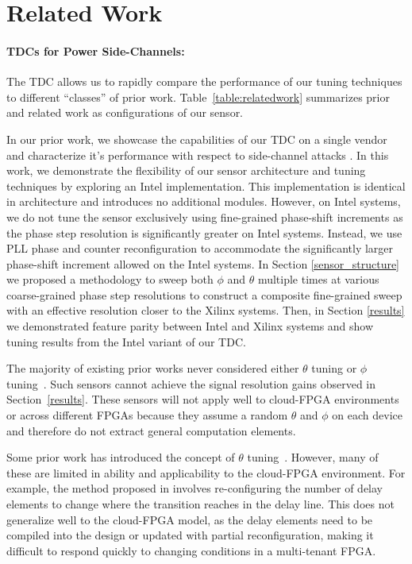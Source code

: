 
\section{Related Work}
\label{related}
\paragraph{\textbf{TDCs for Power Side-Channels: }}

The \name TDC allows us to rapidly compare the performance of our tuning techniques to different ``classes'' of prior work. Table~\ref{table:relatedwork} summarizes prior and related work as configurations of our sensor. 

In our prior work, we showcase the capabilities of our \name TDC on a single vendor and characterize it's performance with respect to side-channel attacks \cite{prior}. In this work, we demonstrate the flexibility of our sensor architecture and tuning techniques by exploring an Intel implementation. This implementation is identical in architecture and introduces no additional modules. However, on Intel systems, we do not tune the sensor exclusively using fine-grained phase-shift increments as the phase step resolution is significantly greater on Intel systems. Instead, we use PLL phase and counter reconfiguration to accommodate the significantly larger phase-shift increment allowed on the Intel systems. In Section \ref{sensor_structure} we proposed a methodology to sweep both $\phi$ and $\theta$ multiple times at various coarse-grained phase step resolutions to construct a composite fine-grained sweep with an effective resolution closer to the Xilinx systems. Then, in Section \ref{results} we demonstrated feature parity between Intel and Xilinx systems and show tuning results from the Intel variant of our \name TDC.

The majority of existing prior works never considered either $\theta$ tuning or $\phi$ tuning~\cite{gobulukoglu2021dac,schellenberg2018inside,schellenberg2018remote, gnad2017voltage}. Such sensors cannot achieve the signal resolution gains observed in Section~\ref{results}. These sensors will not apply well to cloud-FPGA environments or across different FPGAs because they assume a random $\theta$ and $\phi$ on each device and therefore do not extract general computation elements.

Some prior work has introduced the concept of $\theta$ tuning~\cite{favi200917ps, krautter2020cpamap, daigneault2011high, zick2013sensing, glamovcanin2020cloud}. However, many of these are limited in ability and applicability to the cloud-FPGA environment. For example, the method proposed in \cite{favi200917ps} involves re-configuring the number of delay elements to change where the transition reaches in the delay line. This does not generalize well to the cloud-FPGA model, as the delay elements need to be compiled into the design or updated with partial reconfiguration, making it difficult to respond quickly to changing conditions in a multi-tenant FPGA. 

